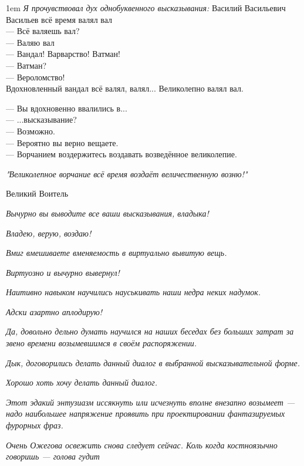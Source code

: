 \begin{flushleft}\parskip1em
    \emph{Я прочувствовал дух однобуквенного высказывания:}
    Василий Васильевич Васильев всё время валял вал\\
    --- Всё валяешь вал?\\
    --- Валяю вал\\
    --- Вандал! Варварство! Ватман!\\
    --- Ватман?\\
    --- Вероломство!\\
    Вдохновленный вандал всё валял, валял... Великолепно валял вал.

    --- Вы вдохновенно ввалились в...\\
    --- ...высказывание?\\
    --- Возможно.\\
    --- Вероятно вы верно вещаете.\\
    --- Ворчанием воздержитесь воздавать возведённое великолепие.

    \emph{"Великолепное ворчание всё время воздаёт величественную возню!"}
    \vspace*{-1em}\begin{flushright}
        Великий Воитель
    \end{flushright}

    \emph{Вычурно вы выводите все ваши высказывания, владыка!}

    \emph{Владею, верую, воздаю!}

    \emph{Вмиг вмешиваете вменяемость в виртуально вывитую вещь.}

    \emph{Виртуозно и вычурно вывернул!}

    \emph{Наитивно навыком научились науськивать наши недра неких надумок.}

    \emph{Адски азартно аплодирую!}

    \emph{Да, довольно дельно думать научился на наших беседах без больших затрат за звено времени возымевшимся в своём распоряжении.}

    \emph{Дык, договорились делать данный диалог в выбранной высказывательной форме.}

    \emph{Хорошо хоть хочу делать данный диалог.}

    \emph{Этот эдакий энтузиазм иссякнуть или исчезнуть вполне внезапно возымеет --- надо наибольшее напряжение проявить при проектировании фантазируемых фурорных фраз.}

    \emph{Очень Ожегова освежить снова следует сейчас. Коль когда костноязычно говоришь --- голова гудит}


\end{flushleft}
